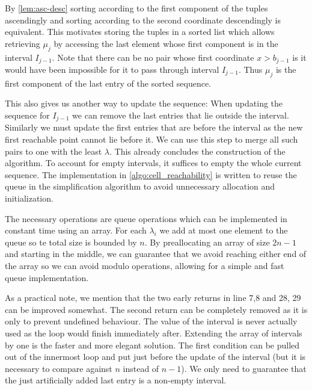By \cref{lem:asc-desc} sorting according to the first component of the tuples ascendingly and sorting according to the second coordinate descendingly is equivalent. This motivates storing the tuples in a sorted list which allows retrieving \(\mu_j\) by accessing the last element whose first component is in the interval \(I_{j-1}\). Note that there can be no pair whose first coordinate \(x > b_{j-1}\) is it would have been impossible for it to pass through interval \(I_{j-1}\). Thus \(\mu_j\) is the first component of the last entry of the sorted sequence. 

This also gives us another way to update the sequence: When updating the sequence for \(I_{j-1}\) we can remove the last entries that lie outside the interval. Similarly we must update the first entries that are before the interval as the new first reachable point cannot lie before it. We can use this step to merge all such pairs to one with the least \(\lambda\). This already concludes the construction of the algorithm. To account for empty intervals, it suffices to empty the whole current sequence. The implementation in \cref{algo:cell_reachability} is written to reuse the queue in the simplification algorithm to avoid unnecessary allocation and initialization.

The necessary operations are queue operations which can be implemented in constant time using an array. For each \(\lambda_i\) we add at most one element to the queue so te total size is bounded by \(n\). By preallocating an array of size \(2n - 1\) and starting in the middle, we can guarantee that we avoid reaching either end of the array so we can avoid modulo operations, allowing for a simple and fast queue implementation.

As a practical note, we mention that the two early returns in line 7,8 and 28, 29 can be improved somewhat. The second return can be completely removed as it is only to prevent undefined behaviour. The value of the interval is never actually used as the loop would finish immediately after. Extending the array of intervals by one is the faster and more elegant solution. The first condition can be pulled out of the innermost loop and put just before the update of the interval (but it is necessary to compare against \(n\) instead of \(n-1\)). We only need to guarantee that the just artificially added last entry is a non-empty interval. 

